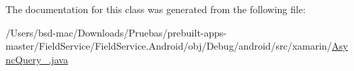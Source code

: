 The documentation for this class was generated from the following file\+:\begin{DoxyCompactItemize}
\item 
/\+Users/bsd-\/mac/\+Downloads/\+Pruebas/prebuilt-\/apps-\/master/\+Field\+Service/\+Field\+Service.\+Android/obj/\+Debug/android/src/xamarin/\hyperlink{_async_query__1_8java}{Async\+Query\+\_.\+java}\end{DoxyCompactItemize}
